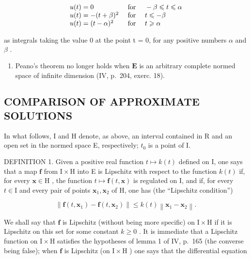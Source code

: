 \[
\begin{array}{l l} u (t) = 0 & \text { for } \quad - \beta \leqslant t \leqslant \alpha \\ u (t) = - (t + \beta) ^ {2} & \text { for } \quad t \leqslant - \beta \\ u (t) = (t - \alpha) ^ {2} & \text { for } \quad t \geqslant \alpha \end{array}
\]

as integrals taking the value 0 at the point t = 0, for any positive numbers \(\alpha\) and \(\beta\) .

\begin{enumerate}
\def\labelenumi{\arabic{enumi})}
\setcounter{enumi}{1}
\tightlist
\item
  Peano's theorem no longer holds when \(\mathbf{E}\) is an arbitrary complete normed space of infinite dimension (IV, p.~204, exerc. 18).
\end{enumerate}

\subsection{COMPARISON OF APPROXIMATE SOLUTIONS}

In what follows, I and H denote, as above, an interval contained in R and an open set in the normed space E, respectively; \(t_{0}\) is a point of I.

DEFINITION 1. Given a positive real function \(t \mapsto k(t)\) defined on I, one says that a map \(\mathbf{f}\) from \(\mathrm{I} \times \mathrm{H}\) into E is Lipschitz with respect to the function \(k(t)\) if, for every \(\mathbf{x} \in \mathrm{H}\) , the function \(t \mapsto \mathbf{f}(t, \mathbf{x})\) is regulated on I, and if, for every \(t \in \mathrm{I}\) and every pair of points \(\mathbf{x}_1, \mathbf{x}_2\) of H, one has (the ``Lipschitz condition'')

\[
\left\| \mathbf {f} (t, \mathbf {x} _ {1}) - \mathbf {f} (t, \mathbf {x} _ {2}) \right\| \leqslant k (t) \left\| \mathbf {x} _ {1} - \mathbf {x} _ {2} \right\|.\tag{8}
\]

We shall say that \(\mathbf{f}\) is Lipschitz (without being more specific) on \(\mathrm{I} \times \mathrm{H}\) if it is Lipschitz on this set for some constant \(k \geqslant 0\) . It is immediate that a Lipschitz function on \(\mathrm{I} \times \mathrm{H}\) satisfies the hypotheses of lemma 1 of IV, p.~165 (the converse being false); when \(\mathbf{f}\) is Lipschitz (on \(\mathrm{I} \times \mathrm{H}\) ) one says that the differential equation

